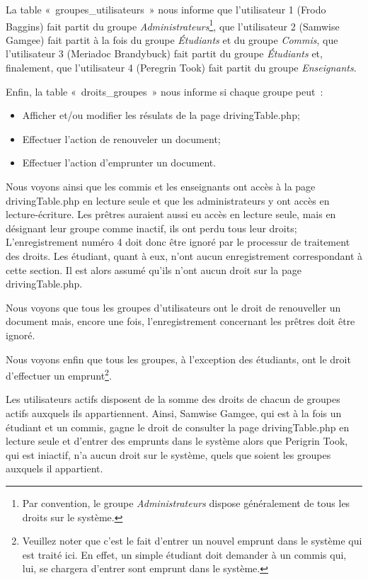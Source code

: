 \documentclass[letter, 10pt]{report}
\begin{document}
La table «~groupes\_utilisateurs~» nous informe que l'utilisateur 1 (Frodo Baggins) fait partit du groupe \emph{Administrateurs}\footnote{Par convention, le groupe \emph{Administrateurs} dispose généralement de tous les droits sur le système.}, que l'utilisateur 2 (Samwise Gamgee) fait partit à la fois du groupe \emph{Étudiants} et du groupe \emph{Commis}, que l'utilisateur 3 (Meriadoc Brandybuck) fait partit du groupe \emph{Étudiants} et, finalement, que l'utilisateur 4 (Peregrin Took) fait partit du groupe \emph{Enseignants}.

Enfin, la table «~droits\_groupes~» nous informe si chaque groupe peut~:

\begin{itemize}
	\item Afficher et/ou modifier les résulats de la page drivingTable.php;
	\item Effectuer l'action de renouveler un document;
	\item Effectuer l'action d'emprunter un document.
\end{itemize}

Nous voyons ainsi que les commis et les enseignants ont accès à la page drivingTable.php en lecture seule et que les administrateurs y ont accès en lecture-écriture. Les prêtres auraient aussi eu accès en lecture seule, mais en désignant leur groupe comme inactif, ils ont perdu tous leur droits; L'enregistrement numéro 4 doit donc être ignoré par le processur de traitement des droits. Les étudiant, quant à eux, n'ont aucun enregistrement correspondant à cette section. Il est alors assumé qu'ils n'ont aucun droit sur la page drivingTable.php.

Nous voyons que tous les groupes d'utilisateurs ont le droit de renouveller un document mais, encore une fois, l'enregistrement concernant les prêtres doit être ignoré.

Nous voyons enfin que tous les groupes, à l'exception des étudiants, ont le droit d'effectuer un emprunt\footnote{Veuillez noter que c'est le fait d'entrer un nouvel emprunt dans le système qui est traité ici. En effet, un simple étudiant doit demander à un commis qui, lui, se chargera d'entrer sont emprunt dans le système.}.

Les utilisateurs actifs disposent de la somme des droits de chacun de groupes actifs auxquels ils appartiennent. Ainsi, Samwise Gamgee, qui est à la fois un étudiant et un commis, gagne le droit de consulter la page drivingTable.php en lecture seule et d'entrer des emprunts dans le système alors que Perigrin Took, qui est iniactif, n'a aucun droit sur le système, quels que soient les groupes auxquels il appartient.
\end{document}

